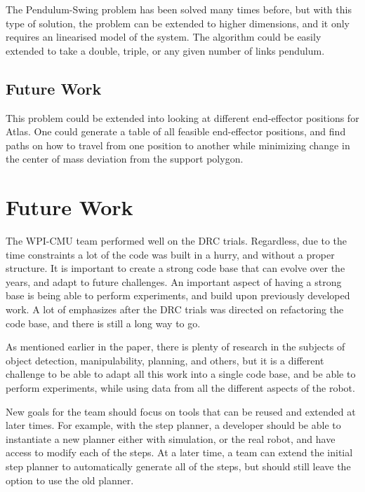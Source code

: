 \documentclass[12pt]{report}
\begin{document}
The Pendulum-Swing problem has been solved many times before, but with this type of solution, the problem can be extended to higher dimensions, and it only requires an linearised model of the system. The algorithm could be easily extended to take a double, triple, or any given number of links pendulum.  

\section{Future Work}
This problem could be extended into looking at different end-effector positions for Atlas. One could generate a table of all feasible end-effector positions, and find paths on how to travel from one position to another while minimizing change in the center of mass deviation from the support polygon.

\chapter{Future Work}

The WPI-CMU team performed well on the DRC trials. Regardless, due to the time constraints a lot of the code was built in a hurry, and without a proper structure. It is important to create a strong code base that can evolve over the years, and adapt to future challenges. An important aspect of having a strong base is being able to perform experiments, and build upon previously developed work. A lot of emphasizes after the DRC trials was directed on refactoring the code base, and there is still a long way to go.


As mentioned earlier in the paper, there is plenty of research in the subjects of object detection, manipulability, planning, and others, but it is a different challenge to be able to adapt all this work into a single code base, and be able to perform experiments, while using data from all the different aspects of the robot. 

New goals for the team should focus on tools that can be reused and extended at later times. For example, with the step planner, a developer should be able to instantiate a new planner either with simulation, or the real robot, and have access to modify each of the steps. At a later time, a team can extend the initial step planner to automatically generate all of the steps, but should still leave the option to use the old planner.
\end{document}
